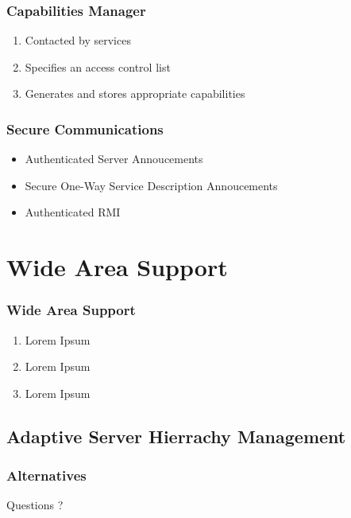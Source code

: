 \documentclass{beamer}
\begin{document}

\begin{frame} %
\frametitle{Capabilities Manager}
\begin{enumerate}
\item \alert<+>{Contacted by services}
\item \alert<+>{Specifies an access control list}
\item \alert<+>{Generates and stores appropriate capabilities}
\end{enumerate}
\end{frame}

\begin{frame}
\frametitle{Secure Communications}
\begin{itemize}[<+->]
\item Authenticated Server Annoucements 
\item Secure One-Way Service Description Annoucements
\item Authenticated RMI
\end{itemize}
\end{frame}

\section{Wide Area Support}
\begin{frame}
\frametitle{Wide Area Support}
\begin{enumerate}[<+->]
\item Lorem Ipsum   
\item Lorem Ipsum
\item Lorem Ipsum
\end{enumerate}
\end{frame}

\subsection{Adaptive Server Hierrachy Management}
\begin{frame}[fragile] %
\frametitle{Alternatives}
\end{frame}


\begin{frame}
\Huge{\centerline{Questions ?}}
\end{frame}

\end{document}
